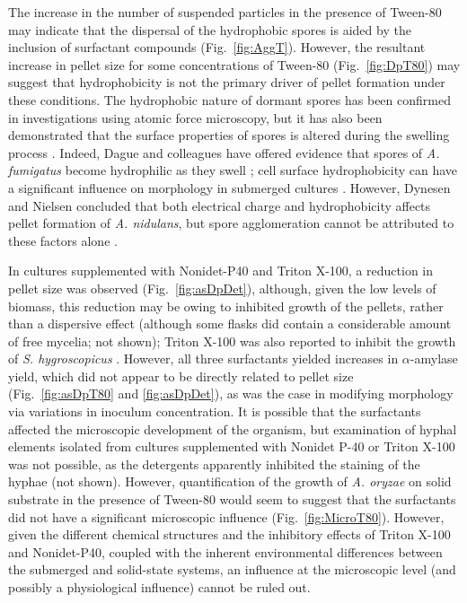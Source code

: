 The increase in the number of suspended particles in the presence of Tween-80 may indicate that the dispersal of the hydrophobic spores is aided by the inclusion of surfactant compounds (Fig.~\ref{fig:AggT}). However, the resultant increase in pellet size for some concentrations of Tween-80 (Fig.~\ref{fig:DpT80}) may suggest that hydrophobicity is not the primary driver of pellet formation under these conditions. The hydrophobic nature of dormant spores has been  confirmed in investigations using atomic force microscopy, but it has also been demonstrated that the surface properties of spores is altered during the swelling process \cite{vanderaa2002}. Indeed, Dague and colleagues have offered evidence that spores of \emph{A. fumigatus} become hydrophilic as they swell \cite{dague2008}; cell surface hydrophobicity can have a significant influence on morphology in submerged cultures \cite{dobson2008a}. However, Dynesen and Nielsen concluded that both electrical charge and hydrophobicity affects pellet formation of \emph{A. nidulans}, but spore agglomeration cannot be attributed to these factors alone \cite{dynesen2003}.

In cultures supplemented with Nonidet-P40 and Triton X-100, a reduction in pellet size was observed (Fig.~\ref{fig:asDpDet}), although, given the low levels of biomass, this reduction may be owing to inhibited growth of the pellets, rather than a dispersive effect (although some flasks did contain a considerable amount of free mycelia; not shown); Triton X-100 was also reported to inhibit the growth of \emph{S. hygroscopicus} \cite{dobson2008b}. However, all three surfactants yielded increases in $\alpha$-amylase yield, which did not appear to be directly related to pellet size (Fig.~\ref{fig:asDpT80} and \ref{fig:asDpDet}), as was the case in modifying morphology via variations in inoculum concentration. It is possible that the surfactants affected the microscopic development of the organism, but examination of hyphal elements isolated from cultures supplemented with Nonidet P-40 or Triton X-100 was not possible, as the detergents apparently inhibited the staining of the hyphae (not shown). However, quantification of the growth of \emph{A. oryzae} on solid substrate in the presence of Tween-80 would seem to suggest that the surfactants did not have a significant microscopic influence (Fig.~\ref{fig:MicroT80}). However, given the different chemical structures and the inhibitory effects of Triton X-100 and Nonidet-P40, coupled with the inherent environmental differences between the submerged and solid-state systems, an influence at the microscopic level (and possibly a physiological influence) cannot be ruled out.


